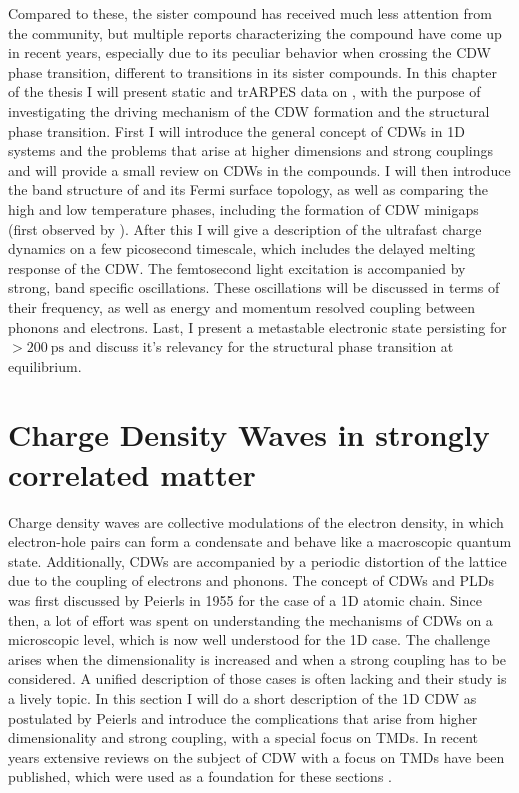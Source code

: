 Compared to these, the sister compound  has received much less attention from the community, but multiple reports characterizing the compound have come up in recent years, especially due to its peculiar behavior when crossing the CDW phase transition, different to transitions in its sister compounds.
In this chapter of the thesis I will present static and trARPES data on , with the purpose of investigating the driving mechanism of the CDW formation and the structural phase transition.
First I will introduce the general concept of CDWs in 1D systems and the problems that arise at higher dimensions and strong couplings and will provide a small review on CDWs in the  compounds.
I will then introduce the band structure of  and its Fermi surface topology, as well as comparing the high and low temperature phases, including the formation of CDW minigaps (first observed by \cite{lin_evidence_2022}).
After this I will give a description of the ultrafast charge dynamics on a few picosecond timescale, which includes the delayed melting response of the CDW.
The femtosecond light excitation is accompanied by strong, band specific oscillations.
These oscillations will be discussed in terms of their frequency, as well as energy and momentum resolved coupling between phonons and electrons.
Last, I present a metastable electronic state persisting for $>\qty{200}{\pico\second}$ and discuss it's relevancy for the structural phase transition at equilibrium.

\section{Charge Density Waves in strongly correlated matter}
\label{sec:cdw}


Charge density waves are collective modulations of the electron density, in which electron-hole pairs can form a condensate and behave like a macroscopic quantum state.
Additionally, CDWs are accompanied by a periodic distortion of the lattice due to the coupling of electrons and phonons.
The concept of CDWs and PLDs was first discussed by Peierls in 1955 \cite{peierls_quantum_1996} for the case of a 1D atomic chain.
Since then, a lot of effort was spent on understanding the mechanisms of CDWs on a microscopic level, which is now well understood for the 1D case.
The challenge arises when the dimensionality is increased and when a strong coupling has to be considered.
A unified description of those cases is often lacking and their study is a lively topic.
In this section I will do a short description of the 1D CDW as postulated by Peierls and introduce the complications that arise from higher dimensionality and strong coupling, with a special focus on TMDs.
In recent years extensive reviews on the subject of CDW with a focus on TMDs have been published, which were used as a foundation for these sections \cite{rossnagel_origin_2011, canadell_importance_1992}.

